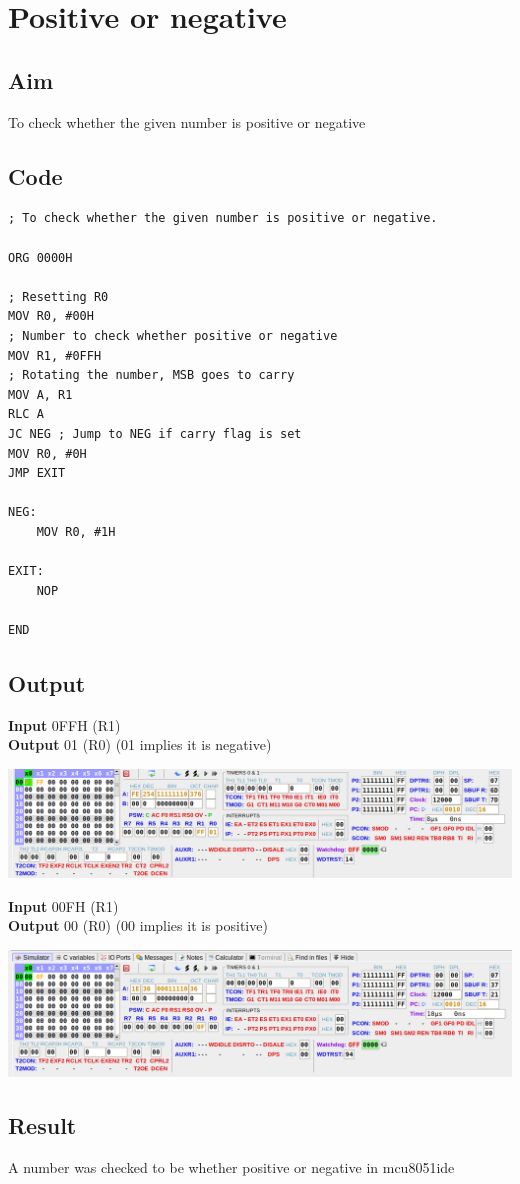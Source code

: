 \section{Positive or negative}
\subsection{Aim}
To check whether the given number is positive or negative

\subsection{Code}
\begin{lstlisting}
; To check whether the given number is positive or negative.

ORG 0000H

; Resetting R0
MOV R0, #00H
; Number to check whether positive or negative
MOV R1, #0FFH
; Rotating the number, MSB goes to carry
MOV A, R1
RLC A
JC NEG ; Jump to NEG if carry flag is set
MOV R0, #0H
JMP EXIT

NEG:
	MOV R0, #1H

EXIT:
	NOP

END
\end{lstlisting}

\subsection{Output}
\textbf{Input} 0FFH (R1)\\
\textbf{Output} 01 (R0) (01 implies it is negative)\\
\begin{center}
	\includegraphics[width=\textwidth]{img/p24/ss1.png}
	\newline
\end{center}

\textbf{Input} 00FH (R1)\\
\textbf{Output} 00 (R0) (00 implies it is positive)\\
\begin{center}
	\includegraphics[width=\textwidth]{img/p24/ss2.png}
\end{center}

\subsection{Result}
A number was checked to be whether positive or negative in mcu8051ide